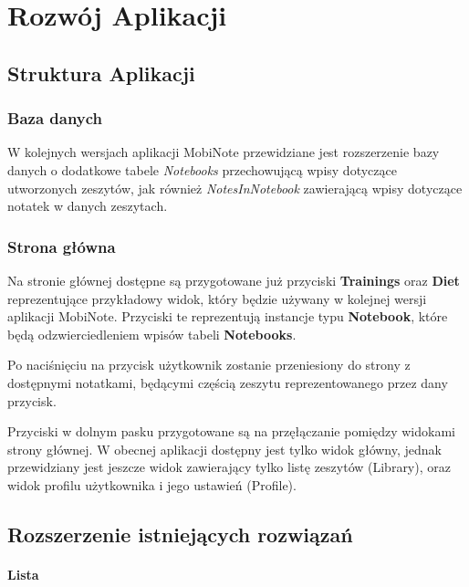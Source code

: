 

\chapter{Rozwój Aplikacji}
\label{ch:rozwoj}

\section{Struktura Aplikacji}

\subsection{Baza danych}

W kolejnych wersjach aplikacji MobiNote przewidziane jest rozszerzenie bazy danych o dodatkowe tabele \textit{Notebooks} przechowującą wpisy dotyczące utworzonych zeszytów, jak również \textit{NotesInNotebook} zawierającą wpisy dotyczące notatek w danych zeszytach.

\subsection{Strona główna}

Na stronie głównej dostępne są przygotowane już przyciski \textbf{Trainings} oraz \textbf{Diet} reprezentujące przykładowy widok, który będzie używany w kolejnej wersji aplikacji MobiNote. Przyciski te reprezentują instancje typu \textbf{Notebook}, które będą odzwierciedleniem wpisów tabeli \textbf{Notebooks}.

Po naciśnięciu na przycisk użytkownik zostanie przeniesiony do strony z dostępnymi notatkami, będącymi częścią zeszytu reprezentowanego przez dany przycisk.

Przyciski w dolnym pasku przygotowane są na przęłączanie pomiędzy widokami strony głównej. W obecnej aplikacji dostępny jest tylko widok główny, jednak przewidziany jest jeszcze widok zawierający tylko listę zeszytów (Library), oraz widok profilu użytkownika i jego ustawień (Profile).

\section{Rozszerzenie istniejących rozwiązań}

\subsubsection{Lista}

